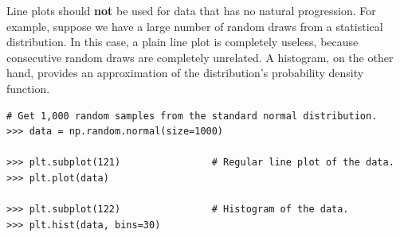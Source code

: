 \begin{warn} %
Line plots should \textbf{not} be used for data that has no natural progression.
For example, suppose we have a large number of random draws from a statistical distribution.
In this case, a plain line plot is completely useless, because consecutive random draws are completely unrelated.
A histogram, on the other hand, provides an approximation of the distribution's probability density function.

\begin{lstlisting}
# Get 1,000 random samples from the standard normal distribution.
>>> data = np.random.normal(size=1000)

>>> plt.subplot(121)                # Regular line plot of the data.
>>> plt.plot(data)

>>> plt.subplot(122)                # Histogram of the data.
>>> plt.hist(data, bins=30)
\end{lstlisting}


\end{warn}
